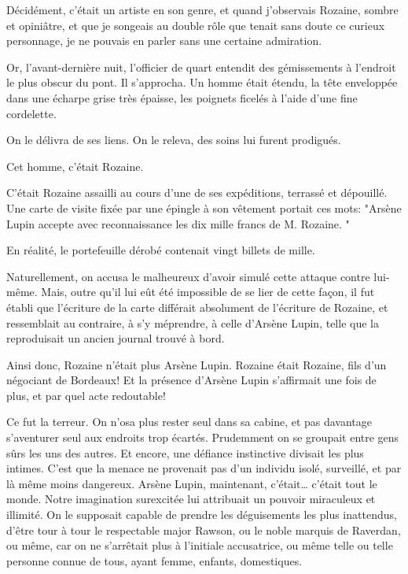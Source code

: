 \documentclass[12pt,a4paper]{article}
\begin{document}
Décidément, c’était un artiste en son genre, et quand j’observais Rozaine, sombre et opiniâtre, et que je songeais au double rôle que tenait sans doute ce curieux personnage, je ne pouvais en parler sans une certaine admiration.

Or, l’avant-dernière nuit, l’officier de quart entendit des gémissements à l’endroit le plus obscur du pont. Il s’approcha. Un homme était étendu, la tête enveloppée dans une écharpe grise très épaisse, les poignets ficelés à l’aide d’une fine cordelette.

On le délivra de ses liens. On le releva, des soins lui furent prodigués.

Cet homme, c’était Rozaine.

C’était Rozaine assailli au cours d’une de ses expéditions, terrassé et dépouillé. Une carte de visite fixée par une épingle à son vêtement portait ces mots: "Arsène Lupin accepte avec reconnaissance les dix mille francs de M. Rozaine. "

En réalité, le portefeuille dérobé contenait vingt billets de mille.

Naturellement, on accusa le malheureux d’avoir simulé cette attaque contre lui-même. Mais, outre qu’il lui eût été impossible de se lier de cette façon, il fut établi que l’écriture de la carte différait absolument de l’écriture de Rozaine, et ressemblait au contraire, à s’y méprendre, à celle d’Arsène Lupin, telle que la reproduisait un ancien journal trouvé à bord.

Ainsi donc, Rozaine n’était plus Arsène Lupin. Rozaine était Rozaine, fils d’un négociant de Bordeaux! Et la présence d’Arsène Lupin s’affirmait une fois de plus, et par quel acte redoutable!

Ce fut la terreur. On n’osa plus rester seul dans sa cabine, et pas davantage s’aventurer seul aux endroits trop écartés. Prudemment on se groupait entre gens sûrs les uns des autres. Et encore, une défiance instinctive divisait les plus intimes. C’est que la menace ne provenait pas d’un individu isolé, surveillé, et par là même moins dangereux. Arsène Lupin, maintenant, c’était… c’était tout le monde. Notre imagination surexcitée lui attribuait un pouvoir miraculeux et illimité. On le supposait capable de prendre les déguisements les plus inattendus, d’être tour à tour le respectable major Rawson, ou le noble marquis de Raverdan, ou même, car on ne s’arrêtait plus à l’initiale accusatrice, ou même telle ou telle personne connue de tous, ayant femme, enfants, domestiques.
\end{document}
